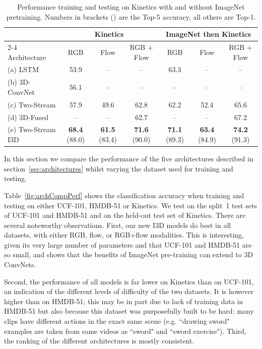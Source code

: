 \documentclass[10pt,twocolumn,letterpaper]{article}
\begin{document}
\begin{table}[h]
\begin{center}
    \begin{tabular}{| l | c | c | c || c | c | c  |}
    \hline
 &  \multicolumn{3}{|c||}{ Kinetics} & \multicolumn{3}{c|}{ImageNet then Kinetics}   \\ \cline{2-4} \cline{5-7} 
Architecture         &  RGB   & Flow  & RGB + Flow & RGB   & Flow  & RGB + Flow    \\ \hline \hline
    (a) LSTM           & 53.9 & --  & -- & 63.3  & -- & --      \\ \hline
    (b) 3D-ConvNet           & 56.1 & --  & -- & -- & -- & --         \\ \hline
    (c) Two-Stream       & 57.9  & 49.6  & 62.8 & 62.2 & 52.4 &   65.6 \\ \hline
    (d) 3D-Fused         & -- & -- & 62.7 & -- & -- & 67.2 \\ \hline \hline
    (e) Two-Stream I3D     & \textbf{68.4} (88.0) & \textbf{61.5} (83.4) & \textbf{71.6} (90.0)
                           & \textbf{71.1} (89.3) & \textbf{63.4} (84.9) & \textbf{74.2} (91.3)      \\ \hline
    \hline
    \end{tabular}
\end{center}
\caption{Performance training and testing on Kinetics with and without ImageNet pretraining. Numbers in
brackets () are the Top-5 accuracy, all others are Top-1.}
\label{fig:archCompPerfKinetics}
\end{table}



In this section we compare the performance of the five architectures described in  section~\ref{sec:architectures} whilst varying the dataset used for training and testing.

Table~\ref{fig:archCompPerf} shows the 
classification accuracy when training and testing on either UCF-101, HMDB-51 or Kinetics. We test on the split~1 test sets of UCF-101 and HMDB-51 and on the held-out test set of Kinetics. There are several noteworthy observations. First, our new I3D models do best in all datasets, with either RGB, flow, or RGB+flow modalities. This is interesting, given its very large number of parameters and that UCF-101 and HMDB-51 are so small, and shows that the benefits of ImageNet pre-training can extend to 3D ConvNets.

Second, the performance of all models is far lower on Kinetics than on UCF-101, an indication of the different levels of difficulty of the two datasets. It is however higher than on HMDB-51; this may be in part due to lack of training data in HMDB-51 but also because this dataset was purposefully built to be hard: many clips have different actions in the exact same scene (e.g. ``drawing sword" examples are taken from same videos as ``sword" and ``sword exercise").  Third, the ranking of the different architectures is mostly consistent.
\end{document}
